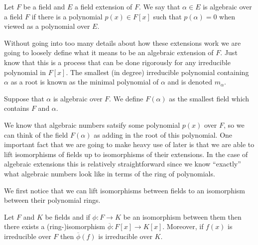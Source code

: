 \begin{defn}
  Let $F$ be a field and $E$ a field extension of $F$.
  We say that $\alpha \in E$ is algebraic over a field $F$ if there is a 
  polynomial $p(x) \in F[x]$ such that $p(\alpha) = 0$ when viewed as
  a polynomial over $E$.
\end{defn}

Without going into too many details about how these extensions work we are
going to loosely define what it means to be an algebraic extension of $F$. Just
know that this is a process that can be done rigorously for any irreducible
polynomial in $F[x]$. The smallest (in degree) irreducible polynomial
containing $\alpha$ as a root is known as the minimal polynomial of $\alpha$
and is denoted $m_{\alpha}$.

\begin{defn}
  Suppose that $\alpha$ is algebraic over $F$. We define $F(\alpha)$ as the
  smallest field which contains $F$ and $\alpha$.
\end{defn}

We know that algebraic numbers satsify some polynomial $p(x)$ over $F$, 
so we can think of the field $F(\alpha)$ as adding in the root of this
polynomial. One important fact that we are going to make heavy use of later is
that we are able to lift isomorphisms of fields up to isomorphisms of their
extensions. In the case of algebraic extensions this is relatively
straightforward since we know ``exactly'' what algebraic numbers look like in
terms of the ring of polynomials. 

We first notice that we can lift isomorphisms between fields to an isomorphism
between their polynomial rings. 

\begin{lemma}\label{lemma:extendtoring}
  Let $F$ and $K$ be fields and if $\phi: F \to K$ be an isomorphism between
  them then there exists a (ring-)isomorphism $\overline{\phi}: F[x] \to
  K[x]$. Moreover, if $f(x)$ is irreducible over $F$ then $\overline{\phi}(f)$ 
  is irreducible over $K$.
\end{lemma}


